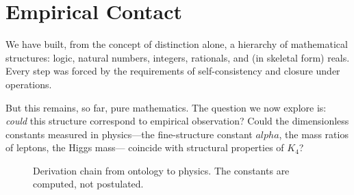 \documentclass[11pt,a4paper]{book}
\def\alpha{alpha}%
\begin{document}
\chapter{Empirical Contact}

We have built, from the concept of distinction alone, a hierarchy of mathematical structures: 
logic, natural numbers, integers, rationals, and (in skeletal form) reals. Every step was 
forced by the requirements of self-consistency and closure under operations.

But this remains, so far, pure mathematics. The question we now explore is: \emph{could} this 
structure correspond to empirical observation? Could the dimensionless constants measured in 
physics—the fine-structure constant $\alpha$, the mass ratios of leptons, the Higgs mass—
coincide with structural properties of $K_4$?

\begin{figure}[h]
\centering
{}
\caption{Derivation chain from ontology to physics. The constants are computed, not postulated.}
\label{fig:ontology-chain}
\end{figure}
\end{document}
